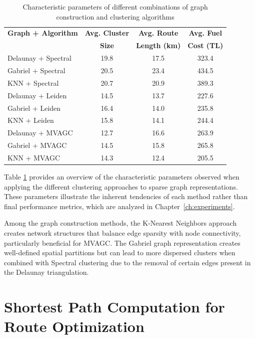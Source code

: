 \begin{table}[h]
\centering
\begin{tabular}{|l|c|c|c|}
\hline
\textbf{Graph + Algorithm} & \textbf{Avg. Cluster} & \textbf{Avg. Route} & \textbf{Avg. Fuel} \\
 & \textbf{Size} & \textbf{Length (km)} & \textbf{Cost (TL)} \\
\hline
Delaunay + Spectral & 19.8 & 17.5 & 323.4 \\
\hline
Gabriel + Spectral & 20.5 & 23.4 & 434.5 \\
\hline
KNN + Spectral & 20.7 & 20.9 & 389.3 \\
\hline
Delaunay + Leiden & 14.5 & 13.7 & 227.6 \\
\hline
Gabriel + Leiden & 16.4 & 14.0 & 235.8 \\
\hline
KNN + Leiden & 15.8 & 14.1 & 244.4 \\
\hline
Delaunay + MVAGC & 12.7 & 16.6 & 263.9 \\
\hline
Gabriel + MVAGC & 14.5 & 15.8 & 265.8 \\
\hline
KNN + MVAGC & 14.3 & 12.4 & 205.5 \\
\hline
\end{tabular}
\caption{Characteristic parameters of different combinations of graph construction and clustering algorithms}
\label{tab:sparse_clustering_comparison}
\end{table}

Table \ref{tab:sparse_clustering_comparison} provides an overview of the characteristic parameters observed when applying the different clustering approaches to sparse graph representations. These parameters illustrate the inherent tendencies of each method rather than final performance metrics, which are analyzed in Chapter~\ref{ch:experiments}.

Among the graph construction methods, the K-Nearest Neighbors approach creates network structures that balance edge sparsity with node connectivity, particularly beneficial for MVAGC. The Gabriel graph representation creates well-defined spatial partitions but can lead to more dispersed clusters when combined with Spectral clustering due to the removal of certain edges present in the Delaunay triangulation.


\section{Shortest Path Computation for Route Optimization}
\label{sec:shortest_path}

